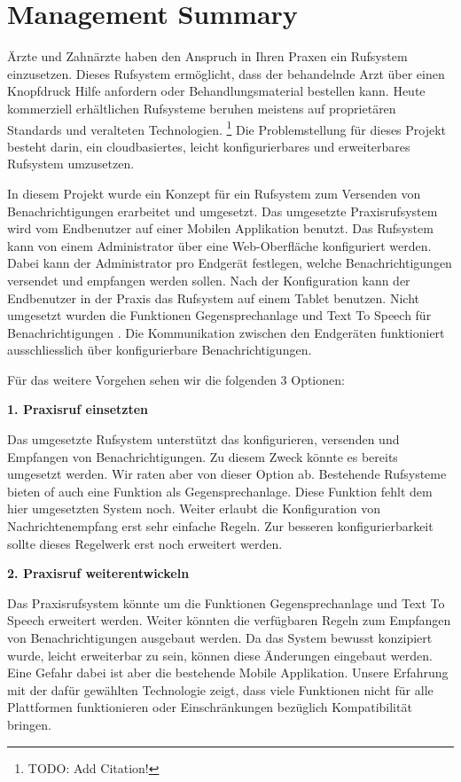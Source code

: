 \section*{Management Summary}

Ärzte und Zahnärzte haben den Anspruch in Ihren Praxen ein Rufsystem einzusetzen.
Dieses Rufsystem ermöglicht, dass der behandelnde Arzt über einen Knopfdruck Hilfe anfordern oder Behandlungsmaterial bestellen kann.
Heute kommerziell erhältlichen Rufsysteme beruhen meistens auf proprietären Standards und veralteten Technologien. \footnote{TODO: Add Citation!}
Die Problemstellung für dieses Projekt besteht darin, ein cloudbasiertes, leicht konfigurierbares und erweiterbares Rufsystem umzusetzen.

In diesem Projekt wurde ein Konzept für ein Rufsystem zum Versenden von Benachrichtigungen erarbeitet und umgesetzt.
Das umgesetzte Praxisrufsystem wird vom Endbenutzer auf einer Mobilen Applikation benutzt.
Das Rufsystem kann von einem Administrator über eine Web-Oberfläche konfiguriert werden.
Dabei kann der Administrator pro Endgerät festlegen, welche Benachrichtigungen versendet und empfangen werden sollen.
Nach der Konfiguration kann der Endbenutzer in der Praxis das Rufsystem auf einem Tablet benutzen.
Nicht umgesetzt wurden die Funktionen Gegensprechanlage und Text To Speech für Benachrichtigungen .
Die Kommunikation zwischen den Endgeräten funktioniert ausschliesslich über konfigurierbare Benachrichtigungen.

Für das weitere Vorgehen sehen wir die folgenden 3 Optionen:


\textbf{1. Praxisruf einsetzten}

Das umgesetzte Rufsystem unterstützt das konfigurieren, versenden und Empfangen von Benachrichtigungen.
Zu diesem Zweck könnte es bereits umgesetzt werden.
Wir raten aber von dieser Option ab.
Bestehende Rufsysteme bieten of auch eine Funktion als Gegensprechanlage.
Diese Funktion fehlt dem hier umgesetzten System noch.
Weiter erlaubt die Konfiguration von Nachrichtenempfang erst sehr einfache Regeln.
Zur besseren konfigurierbarkeit sollte dieses Regelwerk erst noch erweitert werden.

\textbf{2. Praxisruf weiterentwickeln}

Das Praxisrufsystem könnte um die Funktionen Gegensprechanlage und Text To Speech erweitert werden.
Weiter könnten die verfügbaren Regeln zum Empfangen von Benachrichtigungen ausgebaut werden.
Da das System bewusst konzipiert wurde, leicht erweiterbar zu sein, können diese Änderungen eingebaut werden.
Eine Gefahr dabei ist aber die bestehende Mobile Applikation.
Unsere Erfahrung mit der dafür gewählten Technologie zeigt, dass viele Funktionen nicht für alle Plattformen funktionieren
oder Einschränkungen bezüglich Kompatibilität bringen.

